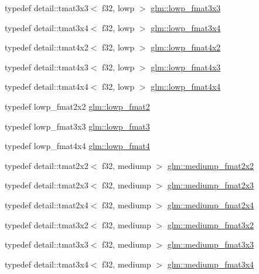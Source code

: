 \begin{DoxyCompactItemize}
\item 
typedef detail\+::tmat3x3$<$ f32, lowp $>$ \hyperlink{group__gtc__type__precision_ga25b389b52269f3256f015b4fff5789c2}{glm\+::lowp\+\_\+fmat3x3}
\item 
typedef detail\+::tmat3x4$<$ f32, lowp $>$ \hyperlink{group__gtc__type__precision_ga366a3249a72ddc76fb3ee4f2379cf3fb}{glm\+::lowp\+\_\+fmat3x4}
\item 
typedef detail\+::tmat4x2$<$ f32, lowp $>$ \hyperlink{group__gtc__type__precision_ga2433f92674e42eb6a75384fbab262306}{glm\+::lowp\+\_\+fmat4x2}
\item 
typedef detail\+::tmat4x3$<$ f32, lowp $>$ \hyperlink{group__gtc__type__precision_gaa4df4f3adcc8eb3bed680b14a87fb2c4}{glm\+::lowp\+\_\+fmat4x3}
\item 
typedef detail\+::tmat4x4$<$ f32, lowp $>$ \hyperlink{group__gtc__type__precision_ga9ff955b170643f547661d2e7263ee426}{glm\+::lowp\+\_\+fmat4x4}
\item 
typedef lowp\+\_\+fmat2x2 \hyperlink{group__gtc__type__precision_ga9bafb192cb7327d543ad55be2e6e675c}{glm\+::lowp\+\_\+fmat2}
\item 
typedef lowp\+\_\+fmat3x3 \hyperlink{group__gtc__type__precision_ga88ae00cab6aae48d56700915c7799973}{glm\+::lowp\+\_\+fmat3}
\item 
typedef lowp\+\_\+fmat4x4 \hyperlink{group__gtc__type__precision_ga00dfb85ec53bb5f173747f73d13c1b8b}{glm\+::lowp\+\_\+fmat4}
\item 
typedef detail\+::tmat2x2$<$ f32, mediump $>$ \hyperlink{group__gtc__type__precision_gae9af1d96efbaeeb5c5edd9c7b0a24fa5}{glm\+::mediump\+\_\+fmat2x2}
\item 
typedef detail\+::tmat2x3$<$ f32, mediump $>$ \hyperlink{group__gtc__type__precision_gaae7081e19f495e7cdbf727e1550b95a8}{glm\+::mediump\+\_\+fmat2x3}
\item 
typedef detail\+::tmat2x4$<$ f32, mediump $>$ \hyperlink{group__gtc__type__precision_ga8f793d90a5a6bea23c13ad195fcb5de2}{glm\+::mediump\+\_\+fmat2x4}
\item 
typedef detail\+::tmat3x2$<$ f32, mediump $>$ \hyperlink{group__gtc__type__precision_ga40681f25413b8705b16da2f534692f59}{glm\+::mediump\+\_\+fmat3x2}
\item 
typedef detail\+::tmat3x3$<$ f32, mediump $>$ \hyperlink{group__gtc__type__precision_gaa7f015dd5b962a658178bb881d4620cc}{glm\+::mediump\+\_\+fmat3x3}
\item 
typedef detail\+::tmat3x4$<$ f32, mediump $>$ \hyperlink{group__gtc__type__precision_gafa5aaa948365f349840dfeb9eeebf0cd}{glm\+::mediump\+\_\+fmat3x4}

\end{DoxyCompactItemize}
